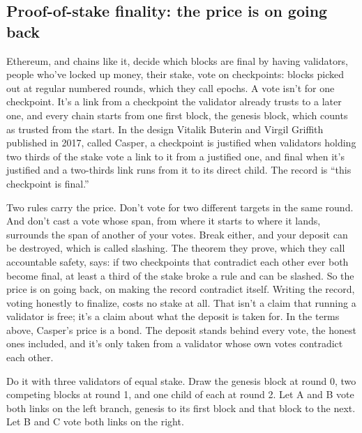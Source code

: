 \documentclass[11pt,twoside]{article}
\theoremstyle{thielethm}
\theoremstyle{thieledef}
\theoremstyle{thieledef}
\theoremstyle{thieledef}
\theoremstyle{thielethm}
\theoremstyle{thieleobs}
\theoremstyle{thielethm}
\begin{document}
\subsection{Proof-of-stake finality: the price is on going back}

Ethereum, and chains like it, decide which blocks are final by having validators, people who've locked up money, their stake, vote on checkpoints: blocks picked out at regular numbered rounds, which they call epochs. A vote isn't for one checkpoint. It's a link from a checkpoint the validator already trusts to a later one, and every chain starts from one first block, the genesis block, which counts as trusted from the start. In the design Vitalik Buterin and Virgil Griffith published in 2017, called Casper, a checkpoint is justified when validators holding two thirds of the stake vote a link to it from a justified one, and final when it's justified and a two-thirds link runs from it to its direct child. The record is ``this checkpoint is final.''

Two rules carry the price. Don't vote for two different targets in the same round. And don't cast a vote whose span, from where it starts to where it lands, surrounds the span of another of your votes. Break either, and your deposit can be destroyed, which is called slashing. The theorem they prove, which they call accountable safety, says: if two checkpoints that contradict each other ever both become final, at least a third of the stake broke a rule and can be slashed. So the price is on going back, on making the record contradict itself. Writing the record, voting honestly to finalize, costs no stake at all. That isn't a claim that running a validator is free; it's a claim about what the deposit is taken for. In the terms above, Casper's price is a bond. The deposit stands behind every vote, the honest ones included, and it's only taken from a validator whose own votes contradict each other.

Do it with three validators of equal stake. Draw the genesis block at round 0, two competing blocks at round 1, and one child of each at round 2. Let A and B vote both links on the left branch, genesis to its first block and that block to the next. Let B and C vote both links on the right.

\begin{center}
\end{center}
\end{document}

